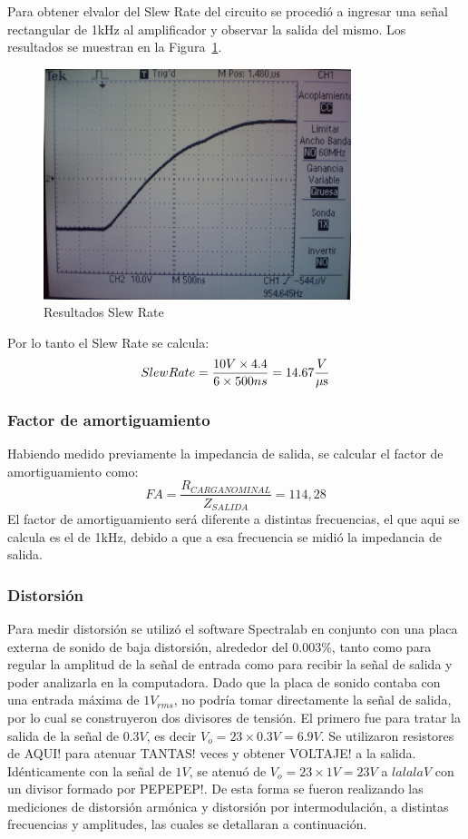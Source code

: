 Para obtener elvalor del Slew Rate del circuito se procedió a ingresar una señal rectangular de 1kHz al amplificador y observar la salida del mismo. Los resultados se muestran en la Figura~\ref{slew_rate_completo}.

\begin{figure}[H]
\centering
\includegraphics[width=0.8\textwidth]{img/slew_rate_salida.jpg}
\caption{Resultados Slew Rate}
\label{slew_rate_completo} 
\end{figure}


Por lo tanto el Slew Rate se calcula:
$$
Slew Rate =\frac{10V \times 4.4}{6 \times 500ns} = 14.67 \frac{V}{\mu\mbox{s}}
$$
\medskip
\subsubsection{Factor de amortiguamiento}

Habiendo medido previamente la impedancia de salida, se calcular el factor de amortiguamiento
como: 
$$
FA = \frac{R_{CARGA NOMINAL}}{Z_{SALIDA}} = 114,28
$$
El factor de amortiguamiento será diferente a distintas frecuencias, el que aqui se calcula es el de 1kHz, debido a que a esa frecuencia se midió la impedancia de salida.

\subsubsection{Distorsión}

Para medir distorsión se utilizó el software Spectralab en conjunto con una placa externa de sonido de baja distorsión, alrededor del $0.003\%$, tanto como para regular la amplitud de la señal de entrada como para recibir la señal de salida y poder analizarla en la computadora.
Dado que la placa de sonido contaba con una entrada máxima de $1V_{rms}$, no podría tomar directamente la señal de salida, por lo cual se construyeron dos divisores de tensión. El primero fue para tratar la salida de la señal de $0.3V$, es decir $V_o=23\times0.3V=6.9V$. Se utilizaron resistores de AQUI! para atenuar TANTAS! veces y obtener VOLTAJE! a la salida. Idénticamente con la señal de $1V$, se atenuó de $V_o=23\times1V=23V$ a $lalalaV$ con un divisor formado por PEPEPEP!.
De esta forma se fueron realizando las mediciones de distorsión armónica y distorsión por intermodulación, a distintas frecuencias y amplitudes, las cuales se detallaran a continuación.

